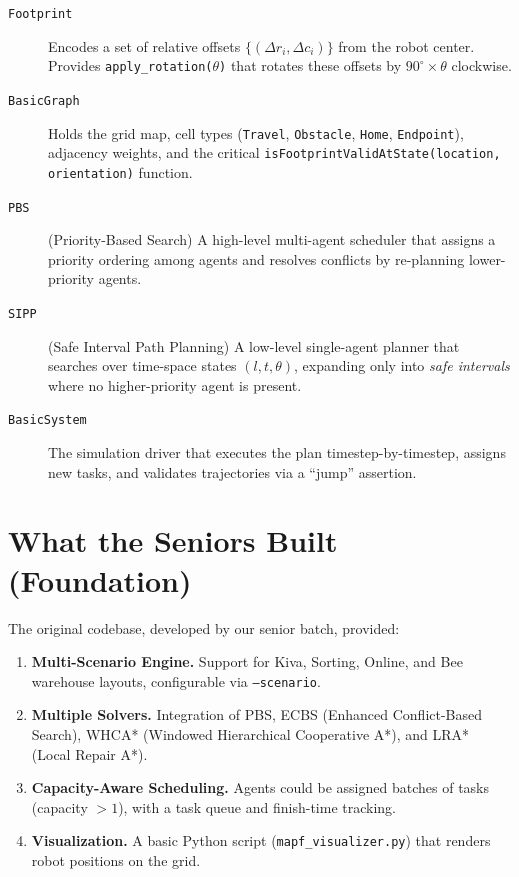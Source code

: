 \documentclass[12pt, a4paper]{article}
\begin{document}
\begin{description}
    \item[\texttt{Footprint}] Encodes a set of relative offsets $\{(\Delta r_i, \Delta c_i)\}$ from the robot center. Provides \texttt{apply\_rotation($\theta$)} that rotates these offsets by $90^\circ \times \theta$ clockwise.

    \item[\texttt{BasicGraph}] Holds the grid map, cell types (\texttt{Travel}, \texttt{Obstacle}, \texttt{Home}, \texttt{Endpoint}), adjacency weights, and the critical \texttt{isFootprintValidAtState(location, orientation)} function.

    \item[\texttt{PBS}] (Priority-Based Search) A high-level multi-agent scheduler that assigns a priority ordering among agents and resolves conflicts by re-planning lower-priority agents.

    \item[\texttt{SIPP}] (Safe Interval Path Planning) A low-level single-agent planner that searches over time-space states $(l, t, \theta)$, expanding only into \emph{safe intervals} where no higher-priority agent is present.

    \item[\texttt{BasicSystem}] The simulation driver that executes the plan timestep-by-timestep, assigns new tasks, and validates trajectories via a ``jump'' assertion.
\end{description}

\section{What the Seniors Built (Foundation)}
\label{sec:seniors}

The original codebase, developed by our senior batch, provided:

\begin{enumerate}
    \item \textbf{Multi-Scenario Engine.} Support for Kiva, Sorting, Online, and Bee warehouse layouts, configurable via \texttt{--scenario}.

    \item \textbf{Multiple Solvers.} Integration of PBS, ECBS (Enhanced Conflict-Based Search), WHCA* (Windowed Hierarchical Cooperative A*), and LRA* (Local Repair A*).

    \item \textbf{Capacity-Aware Scheduling.} Agents could be assigned batches of tasks (capacity $> 1$), with a task queue and finish-time tracking.

    \item \textbf{Visualization.} A basic Python script (\texttt{mapf\_visualizer.py}) that renders robot positions on the grid.
\end{enumerate}
\end{document}
